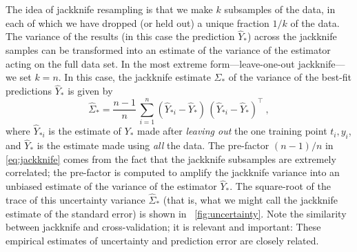 \documentclass[12pt,letterpaper]{article}
\begin{document}
The idea of jackknife resampling is that we make $k$ subsamples of the data, in each of which we have dropped (or held out) a unique fraction $1/k$ of the data.
The variance of the results (in this case the prediction $\hat{Y}_\ast$) across the jackknife samples can be transformed into an estimate of the variance of the estimator acting on the full data set.
In the most extreme form---leave-one-out jackknife---we set $k=n$.
In this case, the jackknife estimate $\hat{\Sigma}_\ast$ of the variance of the best-fit predictions $\hat{Y}_\ast$ is given by
\begin{equation}\label{eq:jackknife}
    \hat{\Sigma}_\ast = \frac{n-1}{n}\,\sum_{i=1}^n (\hat{Y}_{\ast i} - \hat{Y}_\ast)\,(\hat{Y}_{\ast i} - \hat{Y}_\ast)^\top
    ~,
\end{equation}
where $\hat{Y}_{\ast i}$ is the estimate of $Y_\ast$ made after \emph{leaving out} the one training point $t_i, y_i$, and $\hat{Y}_\ast$ is the estimate made using \emph{all} the data.
The pre-factor $(n-1)/n$ in \eqref{eq:jackknife} 
comes from the fact that the jackknife subsamples are extremely correlated; the pre-factor is computed to amplify the jackknife variance into an unbiased estimate of the variance of the estimator $\hat{Y}_\ast$.
The square-root of the trace of this uncertainty variance $\hat{\Sigma}_\ast$ (that is, what we might call the jackknife estimate of the standard error) is shown in \figurename~\ref{fig:uncertainty}.
Note the similarity between jackknife and cross-validation; it is relevant and important: These empirical estimates of uncertainty and prediction error are closely related.
\end{document}
